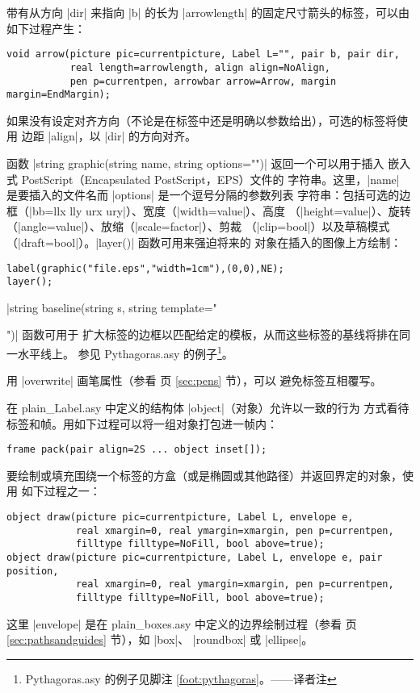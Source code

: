\documentclass[nofonts,CJKnormalspaces]{ctexbook}[2009/05/20]
\newcommand*\prgname[1]{\textsf{#1}}
\newcommand\transnote[1]{\footnote{#1——译者注}}
\begin{document}
带有从方向 |dir| 来指向 |b| 的长为 |arrowlength| 的固定尺寸箭头的标签，可以由
如下过程产生：
\begin{lstlisting}
void arrow(picture pic=currentpicture, Label L="", pair b, pair dir,
           real length=arrowlength, align align=NoAlign,
           pen p=currentpen, arrowbar arrow=Arrow, margin margin=EndMargin);
\end{lstlisting}
如果没有设定对齐方向（不论是在标签中还是明确以参数给出），可选的标签将使用
边距 |align|，以 |dir| 的方向对齐。

函数 |string graphic(string name, string options="")| 返回一个可以用于插入
嵌入式 \prgname{PostScript}（Encapsulated \prgname{PostScript}，EPS）文件的
字符串。这里，|name| 是要插入的文件名而 |options| 是一个逗号分隔的参数列表
字符串：包括可选的边框（|bb=llx lly urx ury|）、宽度（|width=value|）、高度
（|height=value|）、旋转（|angle=value|）、放缩（|scale=factor|）、剪裁
（|clip=bool|）以及草稿模式（|draft=bool|）。|layer()| 函数可用来强迫将来的
对象在插入的图像上方绘制：
\begin{lstlisting}
label(graphic("file.eps","width=1cm"),(0,0),NE);
layer();
\end{lstlisting}

|string baseline(string s, string template="\strut")| 函数可用于
扩大标签的边框以匹配给定的模板，从而这些标签的基线将排在同一水平线上。
参见 \prgname{Pythagoras.asy} 的例子\transnote{\prgname{Pythagoras.asy}
的例子见脚注 \ref{foot:pythagoras}。}。

用 |overwrite| 画笔属性（参看 \pageref{sec:pens} 页 \ref{sec:pens} 节），可以
避免标签互相覆写。

在 \prgname{plain\_Label.asy} 中定义的结构体 |object|（对象）允许以一致的行为
方式看待标签和帧。用如下过程可以将一组对象打包进一帧内：
\begin{lstlisting}
frame pack(pair align=2S ... object inset[]);
\end{lstlisting}
要绘制或填充围绕一个标签的方盒（或是椭圆或其他路径）并返回界定的对象，使用
如下过程之一：
\begin{lstlisting}
object draw(picture pic=currentpicture, Label L, envelope e,
            real xmargin=0, real ymargin=xmargin, pen p=currentpen,
            filltype filltype=NoFill, bool above=true);
object draw(picture pic=currentpicture, Label L, envelope e, pair position,
            real xmargin=0, real ymargin=xmargin, pen p=currentpen,
            filltype filltype=NoFill, bool above=true);
\end{lstlisting}
这里 |envelope| 是在 \prgname{plain\_boxes.asy} 中定义的边界绘制过程（参看
\pageref{sec:pathsandguides} 页 \ref{sec:pathsandguides} 节），如 |box|、
|roundbox| 或 |ellipse|。
\end{document}
